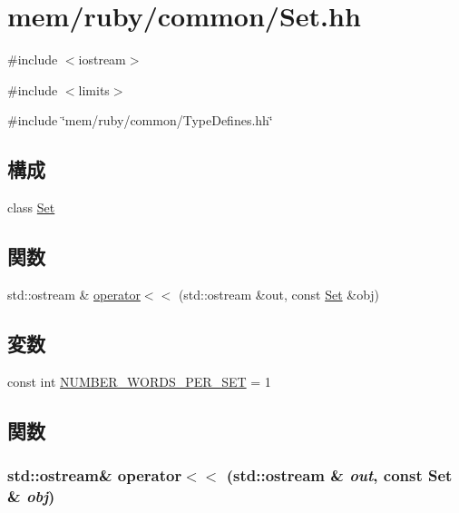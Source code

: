 \hypertarget{Set_8hh}{
\section{mem/ruby/common/Set.hh}
\label{Set_8hh}
}
{\ttfamily \#include $<$iostream$>$}\par
{\ttfamily \#include $<$limits$>$}\par
{\ttfamily \#include \char`\"{}mem/ruby/common/TypeDefines.hh\char`\"{}}\par
\subsection*{構成}
\begin{DoxyCompactItemize}
\item 
class \hyperlink{classSet}{Set}
\end{DoxyCompactItemize}
\subsection*{関数}
\begin{DoxyCompactItemize}
\item 
std::ostream \& \hyperlink{Set_8hh_a4ce0dbb3d4e3689be6dd6156f31e8a64}{operator$<$$<$} (std::ostream \&out, const \hyperlink{classSet}{Set} \&obj)
\end{DoxyCompactItemize}
\subsection*{変数}
\begin{DoxyCompactItemize}
\item 
const int \hyperlink{Set_8hh_aeafee2fb41f8658683a0f674ac339e3d}{NUMBER\_\-WORDS\_\-PER\_\-SET} = 1
\end{DoxyCompactItemize}


\subsection{関数}
\hypertarget{Set_8hh_a4ce0dbb3d4e3689be6dd6156f31e8a64}{
\subsubsection[{operator$<$$<$}]{\setlength{\rightskip}{0pt plus 5cm}std::ostream\& operator$<$$<$ (std::ostream \& {\em out}, \/  const {\bf Set} \& {\em obj})}}
\label{Set_8hh_a4ce0dbb3d4e3689be6dd6156f31e8a64}



